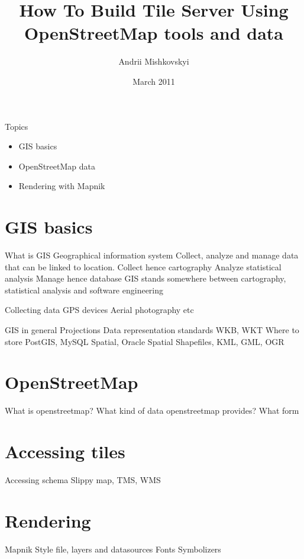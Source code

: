 \documentclass{beamer}
\begin{document}
\title{How To Build Tile Server Using OpenStreetMap tools and data}
\author{Andrii Mishkovskyi}
\date{March 2011}

\maketitle

\begin{frame}{Topics}
  \begin{itemize}
  \item GIS basics
  \item OpenStreetMap data
  \item Rendering with Mapnik
  \end{itemize}
\end{frame}

\section{GIS basics}

\begin{frame}{What is GIS}
  Geographical information system
  Collect, analyze and manage data that can be linked to location.
  Collect hence cartography
  Analyze statistical analysis
  Manage hence database
  GIS stands somewhere between cartography, statistical analysis and software engineering
\end{frame}

\begin{frame}{Collecting data}
  GPS devices
  Aerial photography
  etc
\end{frame}

GIS in general
Projections
Data representation standards
WKB, WKT
Where to store
PostGIS, MySQL Spatial, Oracle Spatial
Shapefiles, KML, GML, OGR

\section{OpenStreetMap}

What is openstreetmap?
What kind of data openstreetmap provides?
What form



\section{Accessing tiles}

Accessing schema
Slippy map, TMS, WMS

\section{Rendering}

Mapnik
Style file, layers and datasources
Fonts
Symbolizers
\end{document}
